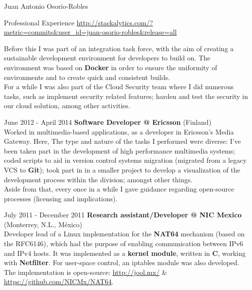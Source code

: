 \documentclass[english,11pt,letterpaper]{article}
\begin{document}
\begin{cv}{Juan Antonio Osorio-Robles}
\begin{cvlist}{Professional Experience}
            \href{http://stackalytics.com/?metric=commits&user_id=juan-osorio-robles&release=all}
            {\url{http://stackalytics.com/?metric=commits&user_id=juan-osorio-robles&release=all}}

            Before this I was part of an integration task force, with the
            aim of creating a sustainable development environment for
            developers to build on. The environment was based on
            \textbf{Docker} in order to ensure the uniformity of
            environments and to create quick and consistent builds.\\

            For a while I was also part of the Cloud Security team where
            I did numerous tasks, such as implement security related
            features; harden and test the security in our cloud solution,
            among other activities.

		\item [June 2012 - April 2014]
            \textbf{Software Developer @ Ericsson} (Finland)\\
            Worked in multimedia-based applications, as a developer in
            Ericsson's Media Gateway. Here, The type and nature of the
            tasks I performed were diverse: I've been taken part in the
            development of high performance multimedia systems; coded
            scripts to aid in version control systems migration (migrated
            from a legacy VCS to \textbf{Git}); took part in in a smaller
            project to develop a visualization of the development process
            within the division; amongst other things.\\

            Aside from that, every once in a while I gave guidance
            regarding open-source processes (licensing and implications).

		\item [July 2011 - December 2011]
            \textbf{Research assistant/Developer @ NIC Mexico} (Monterrey,
            N.L., M\'{e}xico)\\
            Developer lead of a Linux implementation for the \textbf{NAT64}
            mechanism (based on the RFC6146), which had the purpose of
            enabling communication between IPv6 and IPv4 hosts. It was
            implemented as a \textbf{kernel module}, written in \textbf{C},
            working with \textbf{Netfilter}. For user-space control, an
            iptables module was also developed. The implementation is
            open-source:
            \href{http://jool.mx/}{http://jool.mx/} \&\\
            \href{https://github.com/NICMx/NAT64}{https://github.com/NICMx/NAT64}.


\end{cvlist}
\end{cv}
\end{document}
